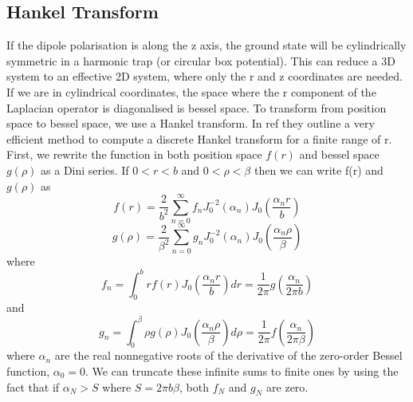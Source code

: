 \documentclass[10pt]{article}
\begin{document}
\begin{multicols}{2}
\section{Hankel Transform}
If the dipole polarisation is along the z axis, the ground state will be cylindrically symmetric in a harmonic trap (or circular box potential). This can reduce a 3D system to an effective 2D system, where only the r and z coordinates are needed. If we are in cylindrical coordinates, the space where the r component of the Laplacian operator is diagonalised is bessel space. To transform from position space to bessel space, we use a Hankel transform. In ref \cite{Kai_Ming_2009} they outline a very efficient method to compute a discrete Hankel transform for a finite range of r. First, we rewrite the function in both position space $f(r)$ and bessel space $g(\rho)$ as a Dini series. If $0<r<b$ and $0<\rho<\beta$ then we can write f(r) and $g(\rho)$ as
\begin{equation}
f(r) = \frac{2}{b^{2}}\sum_{n=0}^{\infty}f_{n}J_{0}^{-2}(\alpha_{n})J_{0}(\frac{\alpha_{n}r}{b})
\end{equation}
\begin{equation}
g(\rho) = \frac{2}{\beta^{2}}\sum_{n=0}^{\infty}g_{n}J_{0}^{-2}(\alpha_{n})J_{0}(\frac{\alpha_{n}\rho}{\beta})
\end{equation}
where 
\begin{equation}
f_{n} = \int_{0}^{b}rf(r)J_{0}(\frac{\alpha_{n}r}{b})dr=\frac{1}{2\pi}g(\frac{\alpha_{n}}{2\pi b})
\end{equation}
and
\begin{equation}
g_{n} = \int_{0}^{\beta}\rho g(\rho)J_{0}(\frac{\alpha_{n}\rho}{\beta})d\rho=\frac{1}{2\pi}f(\frac{\alpha_{n}}{2\pi\beta})
\end{equation}
where $\alpha_{n}$ are the real nonnegative roots of the derivative of the zero-order Bessel function, $\alpha_{0}=0$. We can truncate these infinite sums to finite ones by using the fact that if $\alpha_{N} >S$ where $S=2\pi b\beta$, both $f_{N}$ and $g_{N}$ are zero.


\end{multicols}
\end{document}

